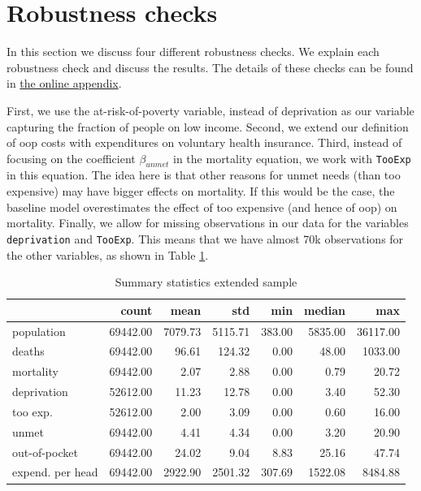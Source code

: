 \documentclass[a4paper,12pt]{article}
\begin{document}
\section{Robustness checks}
\label{sec:org029e7fd}

In this section we discuss four different robustness checks. We explain each robustness check and discuss the results. The details of these checks can be found in \href{https://janboone.github.io/out\_of\_pocket\_payments\_and\_health/index.html}{the online appendix}.

First, we use the at-risk-of-poverty variable, instead of deprivation as our variable capturing the fraction of people on low income. Second, we extend our definition of oop costs with expenditures on voluntary health insurance. Third, instead of focusing on the coefficient \(\beta_{unmet}\) in the mortality equation, we work with \texttt{TooExp} in this equation. The idea here is that other reasons for unmet needs (than too expensive) may have bigger effects on mortality. If this would be the case, the baseline model overestimates the effect of too expensive (and hence of oop) on mortality. Finally, we allow for missing observations in our data for the variables \texttt{deprivation} and \texttt{TooExp}. This means that we have almost 70k observations for the other variables, as shown in Table \ref{tab:summary_extended_data}.

\begin{table}[htbp]
\caption{\label{tab:summary_extended_data}Summary statistics extended sample}
\centering
\begin{tabular}{lrrrrrr}
 & count & mean & std & min & median & max\\
\hline
population & 69442.00 & 7079.73 & 5115.71 & 383.00 & 5835.00 & 36117.00\\
deaths & 69442.00 & 96.61 & 124.32 & 0.00 & 48.00 & 1033.00\\
mortality & 69442.00 & 2.07 & 2.88 & 0.00 & 0.79 & 20.72\\
deprivation & 52612.00 & 11.23 & 12.78 & 0.00 & 3.40 & 52.30\\
too exp. & 52612.00 & 2.00 & 3.09 & 0.00 & 0.60 & 16.00\\
unmet & 69442.00 & 4.41 & 4.34 & 0.00 & 3.20 & 20.90\\
out-of-pocket & 69442.00 & 24.02 & 9.04 & 8.83 & 25.16 & 47.74\\
expend. per head & 69442.00 & 2922.90 & 2501.32 & 307.69 & 1522.08 & 8484.88\\
\end{tabular}
\end{table}
\end{document}
